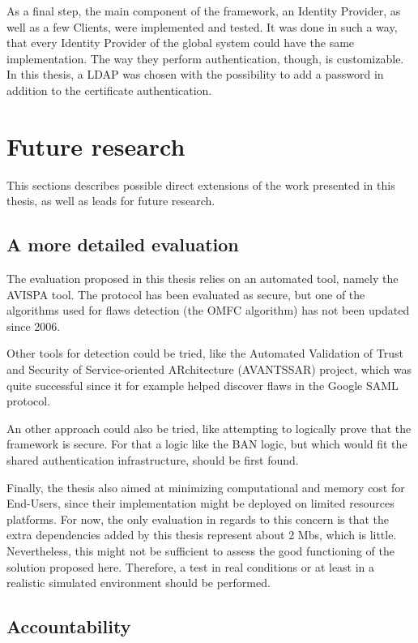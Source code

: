 As a final step, the main component of the framework, an Identity Provider, as well as a few Clients, were implemented and tested. It was done in such a way, that every Identity Provider of the global system could have the same implementation. The way they perform authentication, though, is customizable. In this thesis, a LDAP was chosen with the possibility to add a password in addition to the certificate authentication.

\section{Future research}

This sections describes possible direct extensions of the work presented in this thesis, as well as leads for future research.

\subsection*{A more detailed evaluation}
\addtocounter{subsection}{1}
The evaluation proposed in this thesis relies on an automated tool, namely the AVISPA tool. The protocol has been evaluated as secure, but one of the algorithms used for flaws detection (the OMFC algorithm) has not been updated since 2006. 

Other tools for detection could be tried, like the Automated Validation of Trust and Security of Service-oriented ARchitecture (AVANTSSAR) project, which was quite successful since it for example helped discover flaws in the Google SAML protocol. 

An other approach could also be tried, like attempting to logically prove that the framework is secure. For that a logic like the BAN logic, but which would fit the shared authentication infrastructure, should be first found.

Finally, the thesis also aimed at minimizing computational and memory cost for End-Users, since their implementation might be deployed on limited resources platforms. For now, the only evaluation in regards to this concern is that the extra dependencies added by this thesis represent about 2 Mbs, which is little. Nevertheless, this might not be sufficient to assess the good functioning of the solution proposed here. Therefore, a test in real conditions or at least in a realistic simulated environment should be performed.

\subsection*{Accountability}
\addtocounter{subsection}{1}

